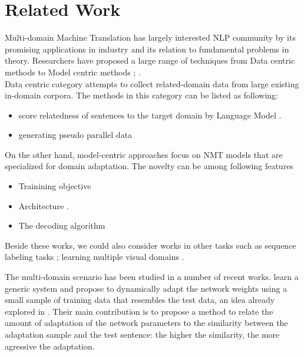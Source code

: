 \documentclass[11pt,a4paper]{article}
\newcommand{\fyTodo}[1]{\Todo[FY:]{\textcolor{orange}{#1}}}
\newcommand{\fyDone}[1]{\done[FY]\Todo[FY:]{\textcolor{orange}{#1}}}
\begin{document}
\section{Related Work \label{sec:related_work}}
\fyDone{Add standard labels to sections}
\fyDone{Related work goes last}
\fyTodo{Compare also to Peng 2017}

Multi-domain Machine Translation has largely interested NLP community by its promising applications in industry and its relation to fundamental problems in theory. Researchers have proposed a large range of techniques from Data centric methods to Model centric methods \cite{Chu18asurvey}; \cite{Chu2017comparison}.\\ Data centric category attempts to collect related-domain data from large existing in-domain corpora. The methods in this category can be listed as following:
\fyTodo{Organize refs}
\begin{itemize}
\item score relatedness of sentences to the target domain by Language Model \cite{Moore2010selection,Axelrod2011domain,Duh2013selection}.
\item generating pseudo parallel data \cite{Utiyama2003measure,Wang2016connecting,Wang2014neural}
\end{itemize}
On the other hand, model-centric approaches focus on NMT models that are specialized for domain adaptation. The novelty can be among following features
\begin{itemize}
\item Trainining objective \cite{Luong2015SNMT,Senrich2016Mono,Wang2017Instance,Chen2017Cost,Miceli2017Regularize,Zhang18sentence}
\item Architecture \cite{gulcehre2016monolingual,Zhang16topicinformed,Kobus17domaincontrol,Britz2017mixing,Biao2017CARENMT,Britz2017mixing,Thompson18freezing,Michel2018extreme}.
\item The decoding algorithm \cite{gulcehre2016monolingual,Khayrallah2017lattice}
\end{itemize}

Beside these works, we could also consider works in other tasks such as sequence labeling tasks \cite{Daume07frustratingly}; learning multiple visual domains \cite{Rebuffi2017Visual}.


The multi-domain scenario has been studied in a number of recent works. \citet{Farajian17multidomain} learn a generic system and propose to dynamically adapt the network weights using a small sample of training data that resembles the test data, an idea already explored in \cite{Sennrich13multidomain}. Their main contribution is to propose a method to relate the amount of adaptation of the network parameters to the similarity between the adaptation sample and the test sentence: the higher the similarity, the more agressive the adaptation.
\end{document}
